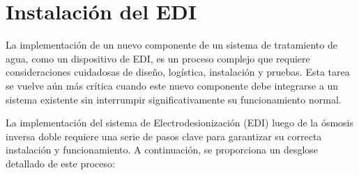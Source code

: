 











\section{Instalación del EDI }
\label{sec:implementation_start}

La implementación de un nuevo componente de un sistema de tratamiento de agua,
como un dispositivo de EDI, es un proceso complejo que requiere consideraciones
cuidadosas de diseño, logística, instalación y pruebas. Esta tarea se vuelve
aún más crítica cuando este nuevo componente debe integrarse a un sistema
existente sin interrumpir significativamente su funcionamiento normal.

La implementación del sistema de Electrodesionización (EDI) luego de la ósmosis inversa doble requiere una serie de pasos clave para garantizar su correcta instalación y funcionamiento. A continuación, se proporciona un desglose detallado de este proceso:

